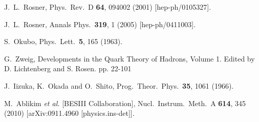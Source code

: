 \begin{thebibliography}{99}



  J.~L.~Rosner,
  Phys.\ Rev.\ D {\bf 64}, 094002 (2001)
  [hep-ph/0105327].

  J.~L.~Rosner,
  Annals Phys.\  {\bf 319}, 1 (2005)
  [hep-ph/0411003].

  S.~Okubo,
  Phys.\ Lett.\  {\bf 5}, 165 (1963).

  G.~Zweig,
  Developments in the Quark Theory of Hadrons, Volume 1. Edited by D. Lichtenberg and S. Rosen. pp. 22-101

  J.~Iizuka, K.~Okada and O.~Shito,
  Prog.\ Theor.\ Phys.\  {\bf 35}, 1061 (1966).




  M.~Ablikim {\it et al.}  [BESIII Collaboration],
  Nucl.\ Instrum.\ Meth.\ A {\bf 614}, 345 (2010)
  [arXiv:0911.4960 [physics.ins-det]].


\end{thebibliography}
